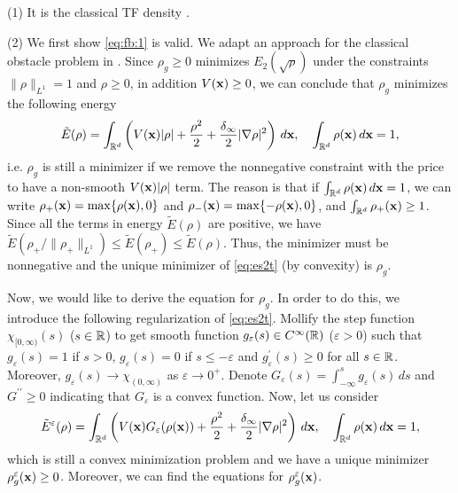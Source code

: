 \documentclass{elsarticle}
\newcommand{\vep}{\varepsilon}
\newcommand{\be}{\begin{equation}}
\newcommand{\ee}{\end{equation}}
\newcommand{\bx}{{\bf x} }
\begin{document}
 (1) It is the classical TF density \cite{Lie}.

 (2) We first show \eqref{eq:fb:1} is valid. We adapt an approach for the classical obstacle problem in \cite{Petro}.
Since $\rho_g\ge0$ minimizes $E_2(\sqrt{\rho})$
under the constraints $\|\rho\|_{L^1}=1$ and $\rho\ge0$, in addition $V(\bx)\ge0$, we can conclude that $\rho_g$ minimizes the
following energy
\be\label{eq:es2t}
\tilde{E}(\rho)=\int_{\Bbb R^d}\left(V(\bx)|\rho|+\frac{\rho^2}{2}
+\frac{\delta_\infty}{2}|\nabla\rho|^2\right)\,d\bx,\quad \int_{\Bbb R^d}\rho(\bx)\,d\bx=1,
\ee
i.e.  $\rho_g$ is still a minimizer if we remove the nonnegative constraint with the price to have a non-smooth $V(\bx)|\rho|$ term. The reason is that if
$\int_{\Bbb R^d}\rho(\bx)\,d\bx=1$, we can write $\rho_+(\bx)=\max\{\rho(\bx),0\}$ and $\rho_-(\bx)=\max\{-\rho(\bx),0\}$, and $\int_{\Bbb R^d}\rho_+(\bx)\ge1$. Since all
the terms in energy $\tilde{E}(\rho)$ are positive, we have $\tilde{E}(\rho_+/\|\rho_+\|_{L^1})\leq \tilde{E}(\rho_+)\leq\tilde{E}(\rho)$. Thus, the minimizer must be nonnegative
and the unique minimizer
of \eqref{eq:es2t} (by convexity) is $\rho_g$.

Now, we would like to derive the equation for $\rho_g$. In order to do this, we introduce the following regularization of \eqref{eq:es2t}. Mollify
 the step function $\chi_{[0,\infty)}(s)$ ($s\in\Bbb R$) to get smooth function $g_\vep(s)\in C^\infty(\Bbb R)$ ($\vep>0$) such that $g_\vep(s)=1$ if $s>0$, $g_\vep(s)=0$ if
 $s\leq-\vep$ and $g_\vep^\prime(s)\ge 0$ for all $s\in\Bbb R$. Moreover, $g_\vep(s)\to \chi_{(0,\infty)}$ as $\vep\to0^+$. Denote $G_\vep(s)=\int_{-\infty}^sg_\vep(s)\,ds$ and
 $G^{\prime\prime}\ge0$ indicating that $G_{\vep}$ is a convex function.
Now, let us consider
\be\label{eq:es2t2}
\tilde{E}^\vep(\rho)=\int_{\Bbb R^d}\left(V(\bx)G_\vep(\rho(\bx))+\frac{\rho^2}{2}
+\frac{\delta_\infty}{2}|\nabla\rho|^2\right)\,d\bx,\quad \int_{\Bbb R^d}\rho(\bx)\,d\bx=1,
\ee
which is still a convex minimization problem and we have a unique  minimizer $\rho^{\vep}_g(\bx)\ge0$. Moreover, we can find the equations for $\rho^{\vep}_g(\bx)$.
\end{document}
